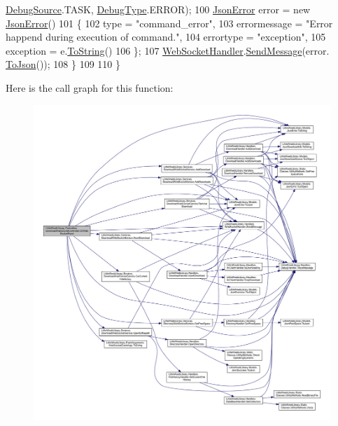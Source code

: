 \begin{DoxyCode}
      \mbox{\hyperlink{namespace_little_weeb_library_1_1_handlers_a2a6ca0775121c9c503d58aa254d292be}{DebugSource}}.TASK, \mbox{\hyperlink{namespace_little_weeb_library_1_1_handlers_ab66019ed40462876ec4e61bb3ccb0a62}{DebugType}}.ERROR);
100                 \mbox{\hyperlink{class_little_weeb_library_1_1_models_1_1_json_error}{JsonError}} error = \textcolor{keyword}{new} \mbox{\hyperlink{class_little_weeb_library_1_1_models_1_1_json_error}{JsonError}}()
101                 \{
102                     type = \textcolor{stringliteral}{"command\_error"},
103                     errormessage = \textcolor{stringliteral}{"Error happend during execution of command."},
104                     errortype = \textcolor{stringliteral}{"exception"},
105                     exception = e.\mbox{\hyperlink{class_little_weeb_library_1_1_models_1_1_json_error_ad7d5522c90119111d2e929f39e7f6d3c}{ToString}}()
106                 \};
107                 \mbox{\hyperlink{class_little_weeb_library_1_1_handlers_1_1_web_socket_handler}{WebSocketHandler}}.\mbox{\hyperlink{class_little_weeb_library_1_1_handlers_1_1_web_socket_handler_a1de289d54d665a32c93478c68d3e6ad0}{SendMessage}}(error.
      \mbox{\hyperlink{class_little_weeb_library_1_1_models_1_1_json_error_a0e3e7dd2e2990404b7f0461742b23440}{ToJson}}());
108             \}
109 
110         \}
\end{DoxyCode}
Here is the call graph for this function\+:\nopagebreak
\begin{figure}[H]
\begin{center}
\leavevmode
\includegraphics[width=350pt]{class_little_weeb_library_1_1_controllers_1_1_download_web_socket_controller_a9e5e421ed57b8b2a294e17d93d027c53_cgraph}
\end{center}
\end{figure}


